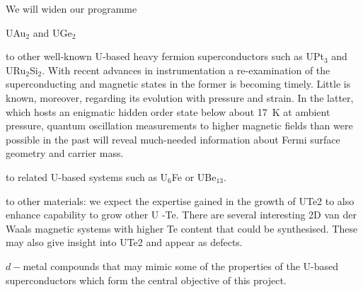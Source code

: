\noindent 
We will widen our  programme
\begin{leftlist}
\item UAu$_2$ and UGe$_2$

\item to other well-known U-based heavy fermion superconductors such as UPt$_3$ and URu$_2$Si$_2$. With recent advances in instrumentation a re-examination of the superconducting and magnetic states in the former is becoming timely. Little is known, moreover, regarding its evolution with pressure and strain. In the latter, which hosts an enigmatic hidden order state below about \SI{17}{\kelvin} at ambient pressure, quantum oscillation measurements to higher magnetic fields than were possible in the past will reveal much-needed information about Fermi surface geometry and carrier mass. 
\item to related U-based systems such as U$_6$Fe or UBe$_{13}$. %
\item to other materials: we expect the expertise gained in the growth of UTe2 to also enhance capability to grow other U -Te.  There are several interesting 2D van der Waals magnetic systems with higher Te content that could be synthesised. These may also give insight into UTe2 and appear as defects.

\item $d-$metal compounds that may mimic some of the properties of the U-based superconductors which form the central objective of this project.
\end{leftlist}


